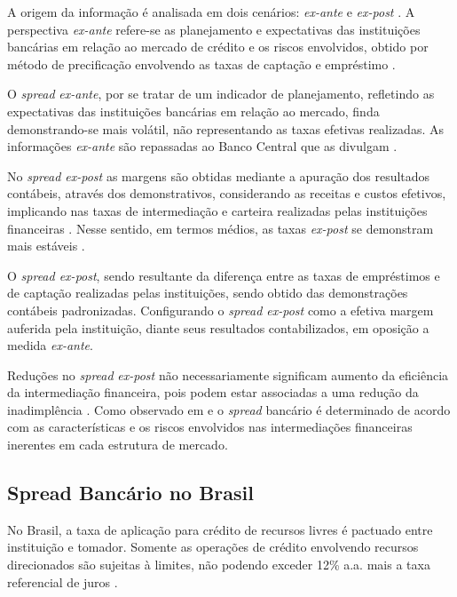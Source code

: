 \documentclass[12pt,12pt,openright,oneside,a4paper,chapter=TITLE,section=TITLE,subsection=TITLE,subsubsection=TITLE,english,french,spanish,portugues,sumario=tradicional]{abntex2}
\begin{document}
A origem da informação é analisada em dois cenários: \emph{ex-ante} e \emph{ex-post} \cite{kunt:1999, levine:1997}. A perspectiva \emph{ex-ante} refere-se as planejamento e expectativas das instituições bancárias em relação ao mercado de crédito e os riscos envolvidos, obtido por método de precificação envolvendo as taxas de captação e empréstimo \cite{durigan:2018, leal:2006, dantas:2012}.

O \emph{spread} \emph{ex-ante}, por se tratar de um indicador de planejamento, refletindo
as expectativas das instituições bancárias em relação ao mercado, finda
demonstrando-se mais volátil, não representando as taxas efetivas realizadas.
As informações \emph{ex-ante} são repassadas ao Banco Central que as divulgam
\cite{durigan:2018, leal:2006, dantas:2012}.

No \emph{spread ex-post} as margens são obtidas mediante a apuração dos resultados
contábeis, através dos demonstrativos, considerando as receitas e custos
efetivos, implicando nas taxas de intermediação e carteira realizadas pelas
instituições financeiras \cite{kunt:1999, durigan:2018}. Nesse sentido, em
termos médios, as taxas \emph{ex-post} se demonstram mais estáveis \cite{leal:2006, dantas:2012}.

O \emph{spread ex-post}, sendo resultante da diferença entre as taxas de empréstimos e de captação realizadas pelas instituições, sendo obtido das demonstrações contábeis padronizadas. Configurando o \emph{spread ex-post} como a efetiva margem auferida pela instituição, diante seus resultados contabilizados, em oposição a medida \emph{ex-ante}\cite{dantas:2012}.

Reduções no \emph{spread} \emph{ex-post} não necessariamente significam aumento da
eficiência da intermediação financeira, pois podem estar associadas a uma
redução da inadimplência \cite{kunt:1999}. Como observado em
\textcite{klein:1971} e \textcite{ho-saunders:1981} o \emph{spread} bancário é
determinado de acordo com as características e os riscos envolvidos nas
intermediações financeiras inerentes em cada estrutura de mercado.

\subsection{Spread Bancário no Brasil}

No Brasil, a taxa de aplicação para crédito de recursos livres é pactuado entre
instituição e tomador. Somente as operações de crédito envolvendo recursos
direcionados são sujeitas à limites, não podendo exceder 12\% a.a. mais a taxa
referencial de juros \cite{BCB:2016}.
\end{document}
